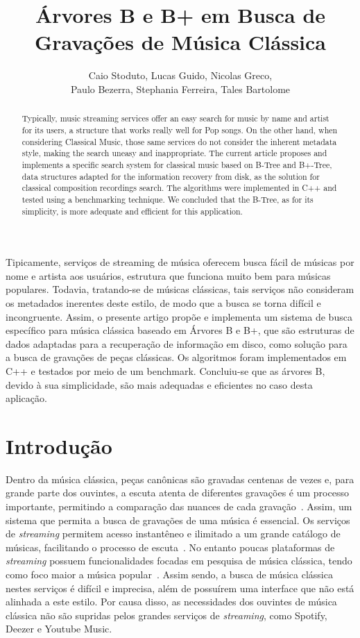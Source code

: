 \documentclass[12pt]{article}
\title{Árvores B e B\nolinebreak+ em Busca de Gravações de Música Clássica\\}
\author{Caio Stoduto\inst{1}, Lucas Guido\inst{1}, Nicolas Greco\inst{1},\\
Paulo Bezerra\inst{1}, Stephania Ferreira\inst{1}, Tales Bartolome\inst{1}}
\begin{document}
 

\maketitle

\begin{abstract}
  Typically, music streaming services offer an easy search for music by name and
  artist for its users, a structure that works really well for Pop songs.
  On the other hand, when considering Classical Music, those same services do
  not consider the inherent metadata style, making the search uneasy and inappropriate.
  The current article proposes and implements a specific search system for
  classical music based on B-Tree and B+-Tree, data structures adapted for the
  information recovery from disk, as the solution for classical composition
  recordings search.
  The algorithms were implemented in C++ and tested using a benchmarking technique.
  We concluded that the B-Tree, as for its simplicity, is more adequate and
  efficient for this application.
\end{abstract}
     
\begin{resumo} 
  Tipicamente, serviços de streaming de música oferecem busca fácil de músicas
  por nome e artista aos usuários, estrutura que funciona muito bem para músicas
  populares.
  Todavia, tratando-se de músicas clássicas, tais serviços não consideram os 
  metadados inerentes deste estilo, de modo que a busca se torna difícil e incongruente.
  Assim, o presente artigo propõe e implementa um sistema de busca específico para música
  clássica baseado em Árvores B e B+, que são estruturas de dados adaptadas para a
  recuperação de informação em disco, como solução para a busca de gravações de
  peças clássicas.
  Os algoritmos foram implementados em C++ e testados por meio de um benchmark.
  Concluiu-se que as árvores B, devido à sua simplicidade, são mais adequadas e
  eficientes no caso desta aplicação.
\end{resumo}

\section{Introdução}
Dentro da música clássica, peças canônicas são gravadas centenas de vezes e,
para grande parte dos ouvintes, a escuta atenta de diferentes gravações é um
processo importante, permitindo a comparação das nuances de cada gravação~\cite{Bl:25}.
Assim, um sistema que permita a busca de gravações de uma música é essencial.
Os serviços de \emph{streaming} permitem acesso instantêneo e ilimitado a um
grande catálogo de músicas, facilitando o processo de escuta~\cite{MoVi:18}.
No entanto poucas plataformas de \emph{streaming} possuem funcionalidades focadas em
pesquisa de música clássica, tendo como foco maior a música popular~\cite{Bl:25}.
Assim sendo, a busca de música clássica nestes serviços é difícil e imprecisa, 
além de possuírem uma interface que não está alinhada a este estilo.
Por causa disso, as necessidades dos ouvintes de música clássica não são supridas
pelos grandes serviços de \emph{streaming}, como Spotify, Deezer e Youtube Music.
\end{document}
